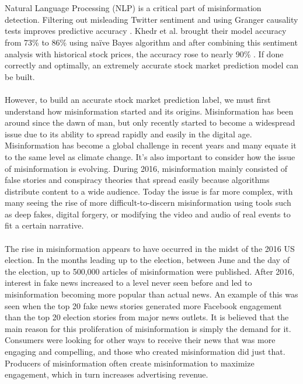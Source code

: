 \documentclass{article}
\begin{document}
\\\\
Natural Language Processing (NLP) is a critical part of misinformation detection. Filtering out misleading Twitter sentiment and using Granger causality tests improves predictive accuracy \cite{source9}. Khedr et al. brought their model accuracy from 73\% to 86\% using naïve Bayes algorithm and after combining this sentiment analysis with historical stock prices, the accuracy rose to nearly 90\% \cite{source10}. If done correctly and optimally, an extremely accurate stock market prediction model can be built.
\\\\
However, to build an accurate stock market prediction label, we must first understand how misinformation started and its origins.  Misinformation has been around since the dawn of man, but only recently started to become a widespread issue due to its ability to spread rapidly and easily in the digital age. \cite {source11, source12} Misinformation has become a global challenge in recent years and many equate it to the same level as climate change. \cite {source13} It’s also important to consider how the issue of misinformation is evolving. During 2016, misinformation mainly consisted of false stories and conspiracy theories that spread easily because algorithms distribute content to a wide audience. \cite{source14} Today the issue is far more complex, with many seeing the rise of more difficult-to-discern misinformation using tools such as deep fakes, digital forgery, or modifying the video and audio of real events to fit a certain narrative. \cite{source11} 
\\\\
The rise in misinformation appears to have occurred in the midst of the 2016 US election. \cite{source11,source13,source14,source15} In the months leading up to the election, between June and the day of the election, up to 500,000 articles of misinformation were published. \cite{source15} After 2016, interest in fake news increased to a level never seen before and led to misinformation becoming more popular than actual news. \cite{source15} An example of this was seen when the top 20 fake news stories generated more Facebook engagement than the top 20 election stories from major news outlets. \cite{source11} It is believed that the main reason for this proliferation of misinformation is simply the demand for it. \cite{source15} Consumers were looking for other ways to receive their news that was more engaging and compelling, and those who created misinformation did just that. Producers of misinformation often create misinformation to maximize engagement, which in turn increases advertising revenue. \cite{source15}
\end{document}
